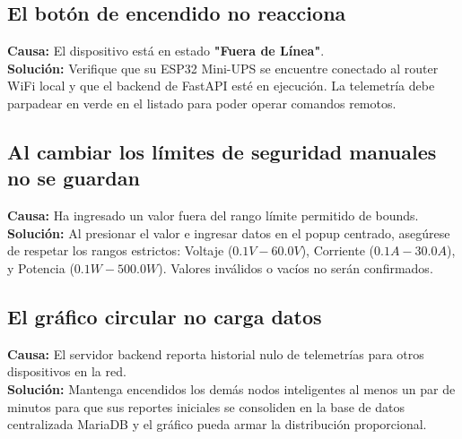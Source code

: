 \documentclass[11pt,a4paper]{article}
\begin{document}
\subsection{El botón de encendido no reacciona}
\textbf{Causa:} El dispositivo está en estado \textbf{"Fuera de Línea"}. \\
\textbf{Solución:} Verifique que su ESP32 Mini-UPS se encuentre conectado al router WiFi local y que el backend de FastAPI esté en ejecución. La telemetría debe parpadear en verde en el listado para poder operar comandos remotos.

\subsection{Al cambiar los límites de seguridad manuales no se guardan}
\textbf{Causa:} Ha ingresado un valor fuera del rango límite permitido de bounds. \\
\textbf{Solución:} Al presionar el valor e ingresar datos en el popup centrado, asegúrese de respetar los rangos estrictos: Voltaje ($0.1V - 60.0V$), Corriente ($0.1A - 30.0A$), y Potencia ($0.1W - 500.0W$). Valores inválidos o vacíos no serán confirmados.

\subsection{El gráfico circular no carga datos}
\textbf{Causa:} El servidor backend reporta historial nulo de telemetrías para otros dispositivos en la red. \\
\textbf{Solución:} Mantenga encendidos los demás nodos inteligentes al menos un par de minutos para que sus reportes iniciales se consoliden en la base de datos centralizada MariaDB y el gráfico pueda armar la distribución proporcional.
\end{document}
